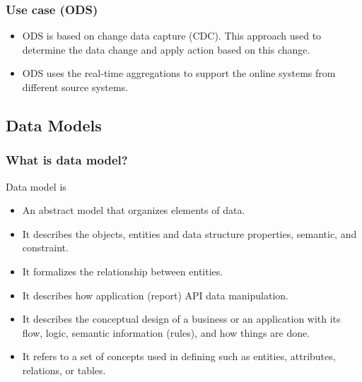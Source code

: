 \begin{frame}
\frametitle{Use case (ODS)}

	\begin{itemize}[<+->]
		\item ODS is based on change data capture (CDC). This approach used to determine the data change and apply action based on this change.
		\item ODS uses the real-time aggregations to support the online systems from different source systems.
	\end{itemize}
\end{frame}

\subsection{Data Models}
\begin{frame}
\frametitle{What is data model?}
Data model is
	\begin{itemize}[<+->]
		\item An abstract model that organizes elements of data.
		\item It describes the objects, entities and data structure properties, semantic, and constraint.
		\item It formalizes the relationship between entities.
		\item It describes how application (report) API data manipulation.
		\item It describes the conceptual design of a business or an application with its flow, logic, semantic information (rules), and how things are done.
		\item It refers to a set of concepts used in defining such as entities, attributes, relations, or tables.
	\end{itemize}
\end{frame}

